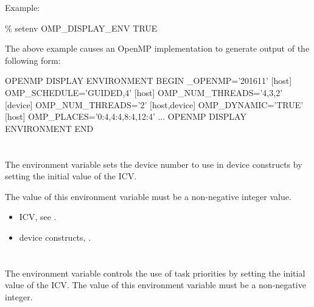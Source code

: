 Example: 
\begin{boxedcode}
\% setenv OMP\_DISPLAY\_ENV TRUE
\end{boxedcode}

The above example causes an OpenMP implementation to generate output of the 
following form:

\begin{boxedcode}
OPENMP DISPLAY ENVIRONMENT BEGIN
  \_OPENMP='201611'
  [host] OMP\_SCHEDULE='GUIDED,4'
  [host] OMP\_NUM\_THREADS='4,3,2'
  [device] OMP\_NUM\_THREADS='2'
  [host,device] OMP\_DYNAMIC='TRUE'
  [host] OMP\_PLACES='{0:4},{4:4},{8:4},{12:4}'
  ...
OPENMP DISPLAY ENVIRONMENT END
\end{boxedcode}








\section{}
\label{sec:OMP_DEFAULT_DEVICE}
The  environment variable sets the device number to use in 
device constructs by setting the initial value of the  ICV.

The value of this environment variable must be a non-negative integer value.

\crossreferences
\begin{itemize}
\item {} ICV, see .

\item device constructs, .
\end{itemize}


\section{}
\label{sec:OMP_MAX_TASK_PRIORITY}

The  environment variable controls the use of task
priorities by setting the initial value of the  ICV. The
value of this environment variable must be a non-negative integer. 

